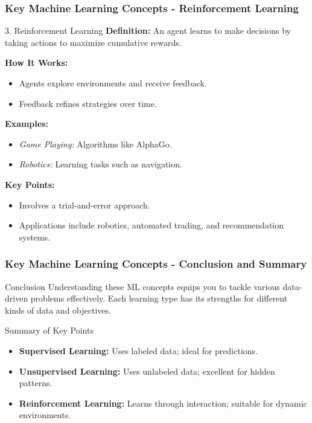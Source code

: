 \documentclass[aspectratio=169]{beamer}
\begin{document}
\begin{frame}[fragile]
    \frametitle{Key Machine Learning Concepts - Reinforcement Learning}
    \begin{block}{3. Reinforcement Learning}
        \textbf{Definition:} An agent learns to make decisions by taking actions to maximize cumulative rewards.

        \textbf{How It Works:}
        \begin{itemize}
            \item Agents explore environments and receive feedback.
            \item Feedback refines strategies over time.
        \end{itemize}

        \textbf{Examples:}
        \begin{itemize}
            \item \textit{Game Playing:} Algorithms like AlphaGo.
            \item \textit{Robotics:} Learning tasks such as navigation.
        \end{itemize}

        \textbf{Key Points:}
        \begin{itemize}
            \item Involves a trial-and-error approach.
            \item Applications include robotics, automated trading, and recommendation systems.
        \end{itemize}
    \end{block}
\end{frame}

\begin{frame}[fragile]
    \frametitle{Key Machine Learning Concepts - Conclusion and Summary}
    \begin{block}{Conclusion}
        Understanding these ML concepts equips you to tackle various data-driven problems effectively. Each learning type has its strengths for different kinds of data and objectives.
    \end{block}

    \begin{block}{Summary of Key Points}
        \begin{itemize}
            \item \textbf{Supervised Learning:} Uses labeled data; ideal for predictions.
            \item \textbf{Unsupervised Learning:} Uses unlabeled data; excellent for hidden patterns.
            \item \textbf{Reinforcement Learning:} Learns through interaction; suitable for dynamic environments.
        \end{itemize}
    \end{block}
\end{frame}
\end{document}
